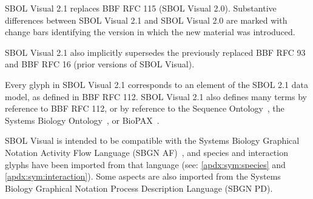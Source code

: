
SBOL Visual 2.1 replaces BBF RFC 115 (SBOL Visual 2.0).
%
Substantive differences between SBOL Visual 2.1 and SBOL Visual 2.0 are marked with change bars identifying the version in which the new material was introduced.

SBOL Visual 2.1 also implicitly supersedes the previously replaced BBF RFC 93 and BBF RFC 16 (prior versions of SBOL Visual).


Every glyph in SBOL Visual 2.1 corresponds to an element of the SBOL 2.1 data model, as defined in BBF RFC 112.
SBOL Visual 2.1 also defines many terms by reference to BBF RFC 112, 
or by reference to the Sequence Ontology~\citep{SequenceOntology},
the Systems Biology Ontology~\citep{SBO},
or BioPAX~\citep{BioPAX}.


SBOL Visual is intended to be compatible with the Systems Biology Graphical Notation Activity Flow Language (SBGN AF)~\citep{sbgn}, 
and species and interaction glyphs have been imported from that language (see: \ref{apdx:sym:species} and \ref{apdx:sym:interaction}).
Some aspects are also imported from the Systems Biology Graphical Notation Process Description Language (SBGN PD).